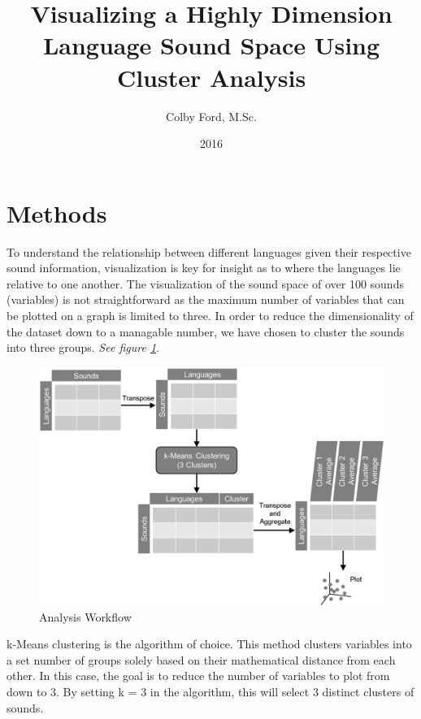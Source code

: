 \documentclass{article}
\title{Visualizing a Highly Dimension Language Sound Space Using Cluster Analysis}
\author{Colby Ford, M.Sc.}
\date{2016}
\begin{document}
\maketitle

\section{Methods}
To understand the relationship between different languages given their respective sound information, visualization is key for insight as to where the languages lie relative to one another. The visualization of the sound space of over 100 sounds (variables) is not straightforward as the maximum number of variables that can be plotted on a graph is limited to three. In order to reduce the dimensionality of the dataset down to a managable number, we have chosen to cluster the sounds into three groups. \cite{napoleon_pavalakodi_2011} \textit{See figure \ref{fig:vizworkflow}}.

\begin{figure}[h!]
\centering
\includegraphics[width=\textwidth]{vizworkflow.png}
\caption{Analysis Workflow}
\label{fig:vizworkflow}
\end{figure}


k-Means clustering is the algorithm of choice. This method clusters variables into a set number of groups solely based on their mathematical distance from each other. In this case, the goal is to reduce the number of variables to plot from  down to 3. By setting k = 3 in the algorithm, this will select 3 distinct clusters of sounds. \cite{mackay_2003}
\end{document}
